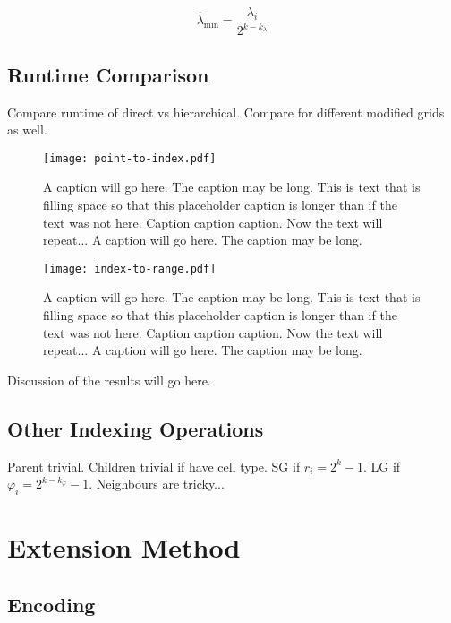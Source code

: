 \begin{equation*}
\hat{\lambda}_\mathrm{min} = \frac{\lambda_i}{2^{k - k_\lambda}}
\end{equation*}


\subsection{Runtime Comparison}
Compare runtime of direct vs hierarchical.
Compare for different modified grids as well.

\begin{figure}[htp!]
	\centering
	\texttt{[image: point-to-index.pdf]}
	\caption[Runtime comparison of SDOG point encoding algorithms]{
		A caption will go here.
		The caption may be long.
		This is text that is filling space so that this placeholder caption is longer than if the text was not here.
		Caption caption caption.
		Now the text will repeat...
		A caption will go here.
		The caption may be long.
	}
	\label{fig:point-to-index}
\end{figure}


\begin{figure}[htp!]
	\centering
	\texttt{[image: index-to-range.pdf]}
	\caption[Runtime comparison of SDOG decoding algorithms]{
		A caption will go here.
		The caption may be long.
		This is text that is filling space so that this placeholder caption is longer than if the text was not here.
		Caption caption caption.
		Now the text will repeat...
		A caption will go here.
		The caption may be long.
	}
	\label{fig:index-to-range}
\end{figure}


Discussion of the results will go here.


\subsection{Other Indexing Operations}
Parent trivial.
Children trivial if have cell type. SG if $r_i = 2^k - 1$. LG if $\varphi_i = 2^{k - k_\varphi} - 1$.
Neighbours are tricky...


\section{Extension Method}


\subsection{Encoding}


